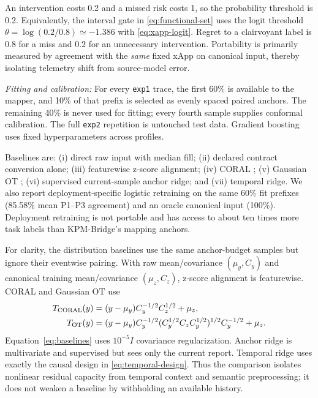 \documentclass[10pt,journal,twoside]{IEEEtran}
\begin{document}
An intervention costs 0.2 and a missed risk costs 1, so the probability threshold is 0.2. Equivalently, the interval gate in \eqref{eq:functional-set} uses the logit threshold $\theta=\log(0.2/0.8)\simeq-1.386$ with \eqref{eq:xapp-logit}. Regret to a clairvoyant label is $0.8$ for a miss and $0.2$ for an unnecessary intervention. Portability is primarily measured by agreement with the \emph{same} fixed xApp on canonical input, thereby isolating telemetry shift from source-model error.

\emph{Fitting and calibration:}
For every \texttt{exp1} trace, the first 60\% is available to the mapper, and 10\% of that prefix is selected as evenly spaced paired anchors. The remaining 40\% is never used for fitting; every fourth sample supplies conformal calibration. The full \texttt{exp2} repetition is untouched test data. Gradient boosting uses fixed hyperparameters across profiles.

Baselines are: (i) direct raw input with median fill; (ii) declared contract conversion alone; (iii) featurewise z-score alignment; (iv) CORAL \cite{sun2016deepcoral}; (v) Gaussian OT \cite{courty2017ot,peyre2019optimal}; (vi) supervised current-sample anchor ridge; and (vii) temporal ridge. We also report deployment-specific logistic retraining on the same 60\% fit prefixes (85.58\% mean P1--P3 agreement) and an oracle canonical input (100\%). Deployment retraining is not portable and has access to about ten times more task labels than KPM-Bridge's mapping anchors.

For clarity, the distribution baselines use the same anchor-budget samples but ignore their eventwise pairing. With raw mean/covariance $(\mu_y,C_y)$ and canonical training mean/covariance $(\mu_z,C_z)$, z-score alignment is featurewise. CORAL and Gaussian OT use
\begin{equation}
\begin{aligned}
T_{\rm CORAL}(y)&=(y-\mu_y)C_y^{-1/2}C_z^{1/2}+\mu_z,\\
T_{\rm OT}(y)&=(y-\mu_y)C_y^{-1/2}
(C_y^{1/2}C_zC_y^{1/2})^{1/2}C_y^{-1/2}+\mu_z.
\end{aligned}
\label{eq:baselines}
\end{equation}
Equation~\eqref{eq:baselines} uses $10^{-5}I$ covariance regularization. Anchor ridge is multivariate and supervised but sees only the current report. Temporal ridge uses exactly the causal design in \eqref{eq:temporal-design}. Thus the comparison isolates nonlinear residual capacity from temporal context and semantic preprocessing; it does not weaken a baseline by withholding an available history.
\end{document}
